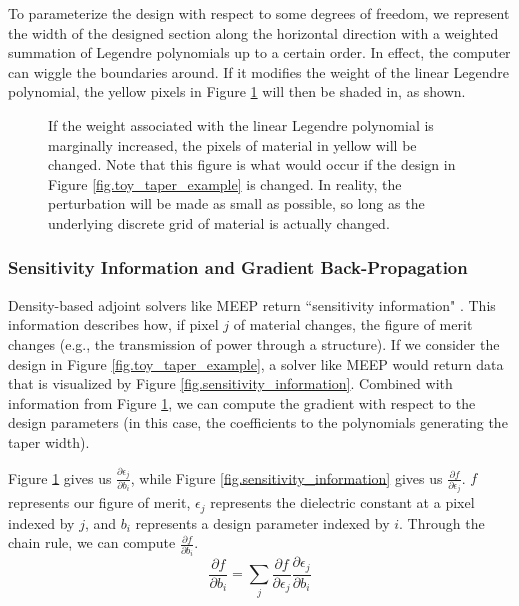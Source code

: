 \documentclass[12pt]{article}
\begin{document}
To parameterize the design with respect to some degrees of freedom, we represent the width of the designed section along the horizontal direction with a weighted summation of Legendre polynomials up to a certain order. In effect, the computer can wiggle the boundaries around. If it modifies the weight of the linear Legendre polynomial, the yellow pixels in Figure \ref{fig.design_perturbation} will then be shaded in, as shown. 

\begin{figure}
\caption{If the weight associated with the linear Legendre polynomial is marginally increased, the pixels of material in yellow will be changed. Note that this figure is what would occur if the design in Figure \ref{fig.toy_taper_example} is changed. In reality, the perturbation will be made as small as possible, so long as the underlying discrete grid of material is actually changed.}
\label{fig.design_perturbation}
\end{figure}

\subsubsection{Sensitivity Information and Gradient Back-Propagation}\label{sec.adjoint}
Density-based adjoint solvers like MEEP return ``sensitivity information" \cite{meep_adjoint}. This information describes how, if pixel $j$ of material changes, the figure of merit changes (e.g., the transmission of power through a structure). If we consider the design in Figure \ref{fig.toy_taper_example}, a solver like MEEP would return data that is visualized by Figure \ref{fig.sensitivity_information}. Combined with information from Figure \ref{fig.design_perturbation}, we can compute the gradient with respect to the design parameters (in this case, the coefficients to the polynomials generating the taper width).

Figure \ref{fig.design_perturbation} gives us $\frac{\partial \epsilon_j}{\partial b_i}$, while Figure \ref{fig.sensitivity_information} gives us $\frac{\partial f}{\partial \epsilon_j}$. $f$ represents our figure of merit, $\epsilon_j$ represents the dielectric constant at a pixel indexed by $j$, and $b_i$ represents a design parameter indexed by $i$. Through the chain rule, we can compute $\frac{\partial f}{\partial b_i}$.
\begin{equation}
\frac{\partial f}{\partial b_i} = \sum_j \frac{\partial f}{\partial \epsilon_j} \frac{\partial \epsilon_j}{\partial b_i}
\end{equation}
\end{document}
